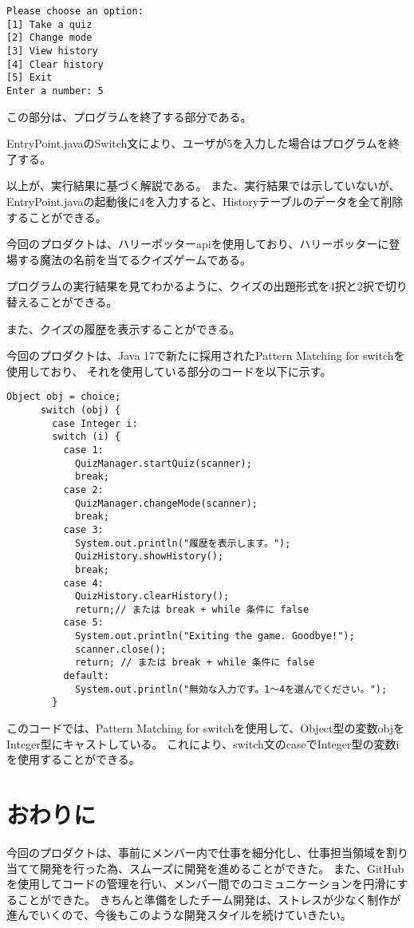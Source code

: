 \documentclass[uplatex,dvipdfmx,a4paper]{jsarticle}
\begin{document}
\begin{lstlisting}[style=result]
  Please choose an option:
[1] Take a quiz
[2] Change mode
[3] View history
[4] Clear history
[5] Exit
Enter a number: 5
\end{lstlisting}
\par この部分は、プログラムを終了する部分である。
\par EntryPoint.javaのSwitch文により、ユーザが5を入力した場合はプログラムを終了する。
\par 以上が、実行結果に基づく解説である。
また、実行結果では示していないが、EntryPoint.javaの起動後に4を入力すると、Historyテーブルのデータを全て削除することができる。
\par 今回のプロダクトは、ハリーポッターapiを使用しており、ハリーポッターに登場する魔法の名前を当てるクイズゲームである。
\par プログラムの実行結果を見てわかるように、クイズの出題形式を4択と2択で切り替えることができる。
\par また、クイズの履歴を表示することができる。
\par 今回のプロダクトは、Java 17で新たに採用されたPattern Matching for switchを使用しており、
それを使用している部分のコードを以下に示す。
\begin{lstlisting}[style=source]
  Object obj = choice;
      switch (obj) {
        case Integer i:
        switch (i) {
          case 1:
            QuizManager.startQuiz(scanner);
            break;
          case 2:
            QuizManager.changeMode(scanner);
            break;
          case 3:
            System.out.println("履歴を表示します。");
            QuizHistory.showHistory();
            break;
          case 4:
            QuizHistory.clearHistory();
            return;// または break + while 条件に false
          case 5:
            System.out.println("Exiting the game. Goodbye!");
            scanner.close();
            return; // または break + while 条件に false
          default:
            System.out.println("無効な入力です。1〜4を選んでください。");
        }

\end{lstlisting}

このコードでは、Pattern Matching for switchを使用して、Object型の変数objをInteger型にキャストしている。
これにより、switch文のcaseでInteger型の変数iを使用することができる。






\section{おわりに}
今回のプロダクトは、事前にメンバー内で仕事を細分化し、仕事担当領域を割り当てて開発を行った為、スムーズに開発を進めることができた。
また、GitHubを使用してコードの管理を行い、メンバー間でのコミュニケーションを円滑にすることができた。
きちんと準備をしたチーム開発は、ストレスが少なく制作が進んでいくので、今後もこのような開発スタイルを続けていきたい。
\end{document}
